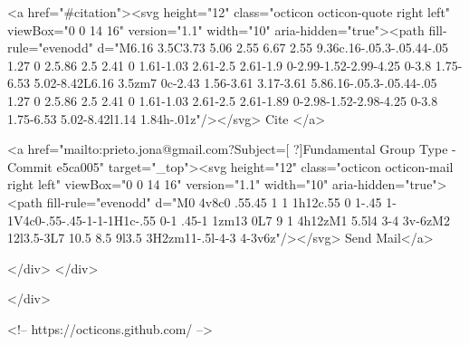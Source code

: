       <a  href="#citation"><svg height="12" class="octicon octicon-quote right left" viewBox="0 0 14 16" version="1.1" width="10" aria-hidden="true"><path fill-rule="evenodd" d="M6.16 3.5C3.73 5.06 2.55 6.67 2.55 9.36c.16-.05.3-.05.44-.05 1.27 0 2.5.86 2.5 2.41 0 1.61-1.03 2.61-2.5 2.61-1.9 0-2.99-1.52-2.99-4.25 0-3.8 1.75-6.53 5.02-8.42L6.16 3.5zm7 0c-2.43 1.56-3.61 3.17-3.61 5.86.16-.05.3-.05.44-.05 1.27 0 2.5.86 2.5 2.41 0 1.61-1.03 2.61-2.5 2.61-1.89 0-2.98-1.52-2.98-4.25 0-3.8 1.75-6.53 5.02-8.42l1.14 1.84h-.01z"/></svg> Cite
      </a>

      <a href="mailto:prieto.jona@gmail.com?Subject=[ ?]Fundamental Group Type - Commit e5ca005" target="_top"><svg height="12" class="octicon octicon-mail right left" viewBox="0 0 14 16" version="1.1" width="10" aria-hidden="true"><path fill-rule="evenodd" d="M0 4v8c0 .55.45 1 1 1h12c.55 0 1-.45 1-1V4c0-.55-.45-1-1-1H1c-.55 0-1 .45-1 1zm13 0L7 9 1 4h12zM1 5.5l4 3-4 3v-6zM2 12l3.5-3L7 10.5 8.5 9l3.5 3H2zm11-.5l-4-3 4-3v6z"/></svg> Send Mail</a>

    </div>
  </div>

</div>

<!-- https://octicons.github.com/ -->





